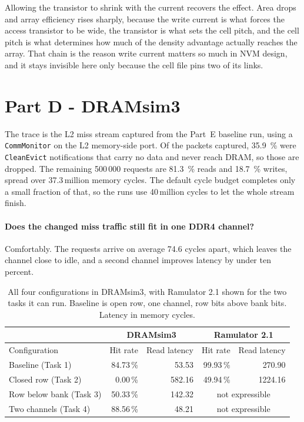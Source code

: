 \documentclass[9pt,a4paper]{extarticle}
\begin{document}
Allowing the transistor to shrink with the current recovers the effect.
Area drops and array efficiency rises sharply, because the write current
is what forces the access transistor to be wide, the transistor is what
sets the cell pitch, and the cell pitch is what determines how much of the
density advantage actually reaches the array. That chain is the reason
write current matters so much in NVM design, and it stays invisible here
only because the cell file pins two of its links.








\section{Part D - DRAMsim3}
\label{sec:d}

The trace is the L2 miss stream captured from the Part~E baseline run,
using a \texttt{CommMonitor} on the L2 memory-side port. Of the packets
captured, \SI{35.9}{\percent} were \texttt{CleanEvict} notifications that
carry no data and never reach DRAM, so those are dropped. The remaining
500\,000 requests are \SI{81.3}{\percent} reads and \SI{18.7}{\percent}
writes, spread over 37.3\,million memory cycles. The default cycle budget
completes only a small fraction of that, so the runs use 40\,million
cycles to let the whole stream finish.

\paragraph{Does the changed miss traffic still fit in one DDR4 channel?}

Comfortably. The requests arrive on average 74.6 cycles apart, which
leaves the channel close to idle, and a second channel improves latency by
under ten percent.

\begin{table}[!ht]\centering\small
\caption{All four configurations in DRAMsim3, with Ramulator 2.1 shown
for the two tasks it can run. Baseline is open row, one channel, row bits
above bank bits. Latency in memory cycles.}
\label{tab:d}
\begin{tabular}{|l|r|r|r|r|}
\hline
& \multicolumn{2}{c|}{DRAMsim3} & \multicolumn{2}{c|}{Ramulator 2.1} \\
\hline
Configuration & Hit rate & Read latency & Hit rate & Read latency \\
\hline
Baseline (Task 1) & 84.73\,\% & 53.53 & 99.93\,\% & 270.90 \\
\hline
Closed row (Task 2) & 0.00\,\% & 582.16 & 49.94\,\% & 1224.16 \\
\hline
Row below bank (Task 3) & 50.33\,\% & 142.32 & \multicolumn{2}{c|}{not expressible} \\
\hline
Two channels (Task 4) & 88.56\,\% & 48.21 & \multicolumn{2}{c|}{not expressible} \\
\hline
\end{tabular}
\end{table}
\end{document}
